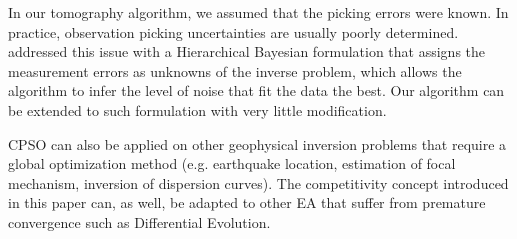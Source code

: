 In our tomography algorithm, we assumed that the picking errors were known. In practice, observation picking uncertainties are usually poorly determined. \cite{Malinverno2004} addressed this issue with a Hierarchical Bayesian formulation that assigns the measurement errors as unknowns of the inverse problem, which allows the algorithm to infer the level of noise that fit the data the best. Our algorithm can be extended to such formulation with very little modification.

CPSO can also be applied on other geophysical inversion problems that require a global optimization method (e.g. earthquake location, estimation of focal mechanism, inversion of dispersion curves). The competitivity concept introduced in this paper can, as well, be adapted to other EA that suffer from premature convergence such as Differential Evolution.